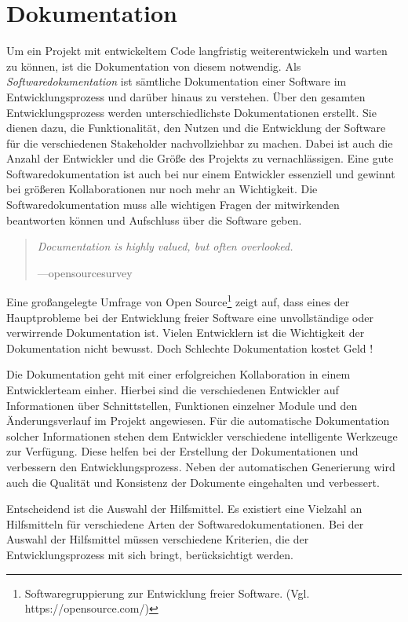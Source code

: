 \section{Dokumentation}
\label{sec:documentation_collaboration}
Um ein Projekt mit entwickeltem Code langfristig weiterentwickeln und warten zu können, ist die Dokumentation von diesem notwendig. Als \textit{Softwaredokumentation} ist sämtliche Dokumentation einer Software im Entwicklungsprozess und darüber hinaus zu verstehen. Über den gesamten Entwicklungsprozess werden unterschiedlichste Dokumentationen erstellt. Sie dienen dazu, die Funktionalität, den Nutzen und die Entwicklung der Software für die verschiedenen Stakeholder nachvollziehbar zu machen. Dabei ist auch die Anzahl der Entwickler und die Größe des Projekts zu vernachlässigen. Eine gute Softwaredokumentation ist auch bei nur einem Entwickler essenziell und gewinnt bei größeren Kollaborationen nur noch mehr an Wichtigkeit. Die Softwaredokumentation muss alle wichtigen Fragen der mitwirkenden beantworten können und Aufschluss über die Software geben.  

\begin{quotation}
	\textit{Documentation is highly valued, but often overlooked.}
	\begin{flushright}
		\footnotesize{---opensourcesurvey}
	\end{flushright}
\end{quotation}

Eine großangelegte Umfrage von Open Source\footnote{Softwaregruppierung zur Entwicklung freier Software. (Vgl. https://opensource.com/)} zeigt auf, dass eines der Hauptprobleme bei der Entwicklung freier Software eine unvollständige oder verwirrende Dokumentation ist.
Vielen Entwicklern ist die Wichtigkeit der Dokumentation nicht bewusst. Doch Schlechte Dokumentation kostet Geld \cite{GitHubInc.2017}!

Die Dokumentation geht mit einer erfolgreichen Kollaboration in einem Entwicklerteam einher. Hierbei sind die verschiedenen Entwickler auf Informationen über Schnittstellen, Funktionen einzelner Module und den Änderungsverlauf im Projekt angewiesen.
Für die automatische Dokumentation solcher Informationen stehen dem Entwickler verschiedene intelligente Werkzeuge zur Verfügung. Diese helfen bei der Erstellung der Dokumentationen und verbessern den Entwicklungsprozess. Neben der automatischen Generierung wird auch die Qualität und Konsistenz der Dokumente eingehalten und verbessert. 

Entscheidend ist die Auswahl der Hilfsmittel. Es existiert eine Vielzahl an Hilfsmitteln für verschiedene Arten der Softwaredokumentationen. Bei der Auswahl der Hilfsmittel müssen verschiedene Kriterien, die der Entwicklungsprozess mit sich bringt, berücksichtigt werden. 

